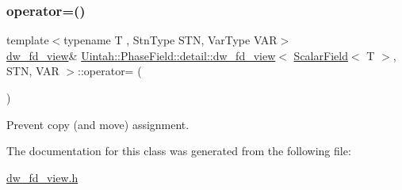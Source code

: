 \subsubsection{\texorpdfstring{operator=()}{operator=()}}
{\footnotesize\ttfamily template$<$typename T , Stn\+Type S\+TN, Var\+Type V\+AR$>$ \\
\hyperlink{classUintah_1_1PhaseField_1_1detail_1_1dw__fd__view}{dw\+\_\+fd\+\_\+view}\& \hyperlink{classUintah_1_1PhaseField_1_1detail_1_1dw__fd__view}{Uintah\+::\+Phase\+Field\+::detail\+::dw\+\_\+fd\+\_\+view}$<$ \hyperlink{structUintah_1_1PhaseField_1_1ScalarField}{Scalar\+Field}$<$ T $>$, S\+TN, V\+AR $>$\+::operator= (\begin{DoxyParamCaption}\item[{const \hyperlink{classUintah_1_1PhaseField_1_1detail_1_1dw__fd__view}{dw\+\_\+fd\+\_\+view}$<$ \hyperlink{structUintah_1_1PhaseField_1_1ScalarField}{Scalar\+Field}$<$ T $>$, S\+TN, V\+AR $>$ \&}]{ }\end{DoxyParamCaption})\hspace{0.3cm}{\ttfamily [delete]}}



Prevent copy (and move) assignment. 



The documentation for this class was generated from the following file\+:\begin{DoxyCompactItemize}
\item 
\hyperlink{dw__fd__view_8h}{dw\+\_\+fd\+\_\+view.\+h}\end{DoxyCompactItemize}
